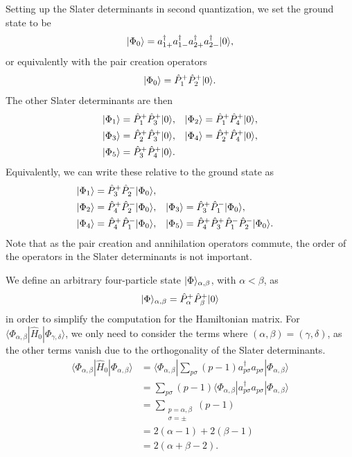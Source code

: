 Setting up the Slater determinants in second quantization, we set the ground state to be
\begin{equation*}
    \lvert\Phi_0\rangle = a_{1+}^\dagger a_{1-}^\dagger a_{2+}^\dagger a_{2-}^\dagger \lvert0\rangle,
\end{equation*}
or equivalently with the pair creation operators
\begin{equation*}
    \lvert\Phi_0\rangle = \hat{P}_1^+ \hat{P}_2^+ \lvert0\rangle.
\end{equation*}
The other Slater determinants are then
\begin{align*}
    \lvert\Phi_1\rangle &= \hat{P}_1^+ \hat{P}_3^+ \lvert0\rangle, &
    \lvert\Phi_2\rangle &= \hat{P}_1^+ \hat{P}_4^+ \lvert0\rangle, \\
    \lvert\Phi_3\rangle &= \hat{P}_2^+ \hat{P}_3^+ \lvert0\rangle, &
    \lvert\Phi_4\rangle &= \hat{P}_2^+ \hat{P}_4^+ \lvert0\rangle, \\
    \lvert\Phi_5\rangle &= \hat{P}_3^+ \hat{P}_4^+ \lvert0\rangle.
\end{align*}
Equivalently, we can write these relative to the ground state as
\begin{align*}
    \lvert\Phi_1\rangle &= \hat{P}_3^+ \hat{P}_2^- \lvert\Phi_0\rangle, \\
    \lvert\Phi_2\rangle &= \hat{P}_4^+ \hat{P}_2^- \lvert\Phi_0\rangle, &
    \lvert\Phi_3\rangle &= \hat{P}_3^+ \hat{P}_1^- \lvert\Phi_0\rangle, \\
    \lvert\Phi_4\rangle &= \hat{P}_4^+ \hat{P}_1^- \lvert\Phi_0\rangle, &
    \lvert\Phi_5\rangle &= \hat{P}_4^+ \hat{P}_3^+ \hat{P}_1^- \hat{P}_2^- \lvert\Phi_0\rangle.
\end{align*}
Note that as the pair creation and annihilation operators commute, the order of the operators in the Slater determinants is not important.

We define an arbitrary four-particle state $\lvert\Phi\rangle_{\alpha, \beta}$, with $\alpha < \beta$, as
\begin{equation*}
    \lvert\Phi\rangle_{\alpha, \beta} = \hat{P}_\alpha^+ \hat{P}_\beta^+ \lvert0\rangle
\end{equation*}
in order to simplify the computation for the Hamiltonian matrix.
For $\langle \Phi_{\alpha, \beta} | \hat{H}_0 | \Phi_{\gamma, \delta} \rangle$, we only need to consider the terms where $(\alpha, \beta) = (\gamma, \delta)$, as the other terms vanish due to the orthogonality of the Slater determinants.
\begin{align*}
    \langle \Phi_{\alpha, \beta} | \hat{H}_0 | \Phi_{\alpha, \beta} \rangle
    &= \langle \Phi_{\alpha, \beta} | \sum_{p\sigma} (p - 1) a_{p\sigma}^\dagger a_{p\sigma} | \Phi_{\alpha, \beta} \rangle \\
    &= \sum_{p\sigma} (p - 1) \langle \Phi_{\alpha, \beta} | a_{p\sigma}^\dagger a_{p\sigma} | \Phi_{\alpha, \beta} \rangle \\
    &= \sum_{\substack{p=\alpha,\beta\\ \sigma=\pm}} (p - 1) \\
    &= 2(\alpha - 1) + 2(\beta - 1) \\
    &= 2(\alpha + \beta - 2).
\end{align*}

